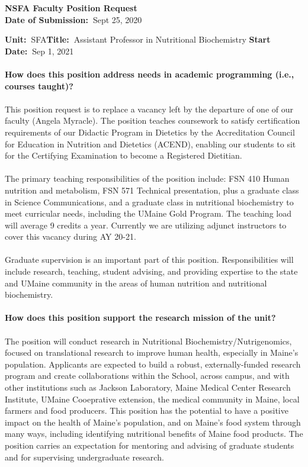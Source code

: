 \documentclass[11pt]{article}
\begin{document}
\sloppy \rmfamily
\begin{center}\textbf{NSFA Faculty Position Request\\Date of Submission:~}Sept 25, 2020\end{center}

\noindent\textbf{Unit:~}SFA\hfill\textbf{Title:~}Assistant Professor in Nutritional Biochemistry \hfill \textbf{Start Date:~}Sep 1, 2021\\~\\
\textbf{How does this position address needs in academic programming (i.e., courses taught)?}\\~\\
\small\sffamily 
This position request is to replace a vacancy left by the departure of one of our faculty (Angela Myracle). The position teaches coursework to satisfy certification requirements of our Didactic Program in Dietetics by the Accreditation Council for Education in Nutrition and Dietetics (ACEND), enabling our students to sit for the Certifying Examination to become a Registered Dietitian.\\~\\
The primary teaching responsibilities of the position include: FSN 410 Human nutrition and metabolism, FSN 571 Technical presentation, plus a graduate class in Science Communications, and a graduate class in nutritional biochemistry to meet curricular needs, including the UMaine Gold Program. The teaching load will average 9 credits a year. Currently we are utilizing adjunct instructors to cover this vacancy during AY 20-21. \\~\\
Graduate supervision is an important part of this position. Responsibilities will include
research, teaching, student advising, and providing expertise to the state and UMaine community in the areas of human nutrition and nutritional biochemistry.\\~\\
\vfill
\noindent\textbf{\rmfamily How does this position support the research mission of the unit?}\\~\\
The position will conduct research in Nutritional Biochemistry/Nutrigenomics, focused on translational research to improve human health, especially in Maine's population. Applicants are expected to build a robust, externally-funded research program and create collaborations within the School, across campus, and with other institutions such as Jackson Laboratory, Maine Medical Center Research Institute, UMaine Cooeprative extension, the medical community in Maine, local farmers and food producers. This position has the potential to have a positive impact on the health of Maine's population, and on Maine's food system through many ways, including identifying  nutritional benefits of Maine food products. The position carries an expectation for mentoring and advising of graduate students and for supervising undergraduate research. 
\end{document}
